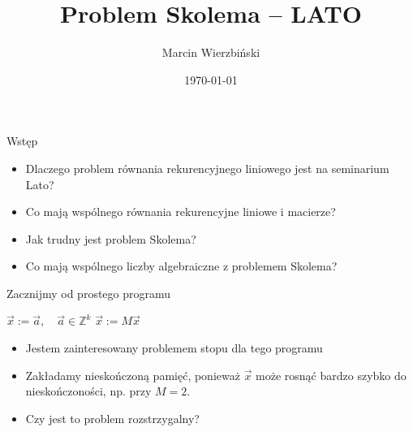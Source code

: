 \documentclass[handout]{beamer}
\title{Problem Skolema -- LATO}
\author{Marcin Wierzbiński}
\institute{MIMUW}
\date{\today}
\def\Z{\mathbb Z}
\theoremstyle{definition}
\theoremstyle{named}
\begin{document}
\frame{\titlepage}

\begin{frame}{Wstęp}
\begin{itemize}
    \item Dlaczego problem równania rekurencyjnego liniowego jest na seminarium Lato? 
    \pause
    \item Co mają wspólnego równania rekurencyjne liniowe i macierze?
    \pause
    \item Jak trudny jest problem Skolema?  
    \pause
    \item Co mają wspólnego liczby algebraiczne z problemem Skolema? 
\end{itemize}
\end{frame}

\begin{frame}{Zacznijmy od prostego programu}
    \begin{algorithm}[H] 
        \begin{algorithmic}[l]
        \State $\vec{x} := \vec{a}, \quad \vec{a} \in \Z^{k}$  
          \State $\vec{x} := M \vec{x}$ \algorithmiccomment{$M \in \Z^{k \times k}$}
          
        \EndWhile
        \end{algorithmic}
    \end{algorithm}
    
    \begin{itemize}
    \pause 
    \item Jestem zainteresowany problemem stopu dla tego programu
    \pause 
    \item  Zakładamy nieskończoną pamięć, ponieważ $\vec{x}$ może rosnąć bardzo szybko do nieskończoności, np. przy $M=2$.
    \pause
    
    \item  Czy jest to problem rozstrzygalny?
    \end{itemize}

\end{frame}
\end{document}
